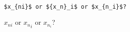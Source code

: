 \documentclass{article}
\begin{document}
\begin{verbatim}

$x_{ni}$ or ${x_n}_i$ or $x_{n_i}$?

\end{verbatim}

$x_{ni}$ or ${x_n}_i$ or $x_{n_i}$?
\end{document}
